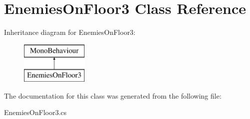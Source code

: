\hypertarget{class_enemies_on_floor3}{}\section{Enemies\+On\+Floor3 Class Reference}
\label{class_enemies_on_floor3}
Inheritance diagram for Enemies\+On\+Floor3\+:\begin{figure}[H]
\begin{center}
\leavevmode
\includegraphics[height=2.000000cm]{class_enemies_on_floor3}
\end{center}
\end{figure}


The documentation for this class was generated from the following file\+:\begin{DoxyCompactItemize}
\item 
Enemies\+On\+Floor3.\+cs\end{DoxyCompactItemize}
